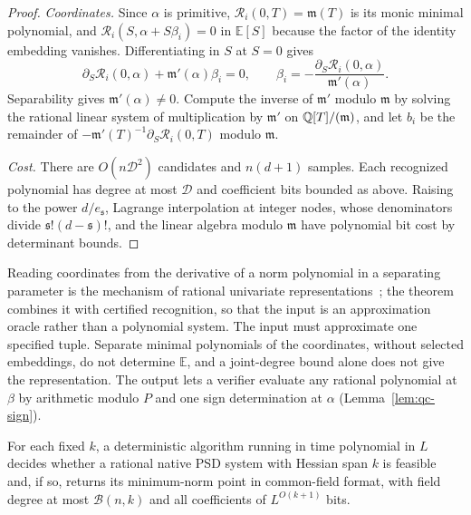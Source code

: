 \begin{proof}
\emph{Coordinates.} Since $\alpha$ is primitive,
$\mathcal R_i(0,T)=\mathfrak m(T)$ is its monic minimal polynomial, and $\mathcal R_i(S,\alpha+S\beta_i)=0$ in
$\mathbb E[S]$ because the factor of the identity embedding vanishes.
Differentiating in $S$ at $S=0$ gives
\[
\partial_S\mathcal R_i(0,\alpha)+\mathfrak m'(\alpha)\beta_i=0,\qquad
\beta_i=-\frac{\partial_S\mathcal R_i(0,\alpha)}{\mathfrak m'(\alpha)} .
\]
Separability gives $\mathfrak m'(\alpha)\ne0$. Compute the inverse of
$\mathfrak m'$ modulo $\mathfrak m$ by solving the rational linear system of multiplication by $\mathfrak m'$ on
$\mathbb Q[T]/(\mathfrak m)$, and let $b_i$ be the remainder of
$-\mathfrak m'(T)^{-1}\partial_S\mathcal R_i(0,T)$ modulo $\mathfrak m$.

\emph{Cost.} There are $O(n\mathcal D^2)$ candidates and $n(d+1)$ samples.
Each recognized polynomial has degree at most $\mathcal D$ and coefficient
bits bounded as above. Raising to the power $d/e_{\mathfrak s}$, Lagrange
interpolation at integer nodes, whose denominators divide $\mathfrak
s!(d-\mathfrak s)!$, and the linear algebra modulo $\mathfrak m$ have polynomial bit
cost by determinant bounds.
\end{proof}

Reading coordinates from the derivative of a norm polynomial in a separating
parameter is the mechanism of rational univariate
representations~\cite{Rouillier1999}; the theorem combines it with certified
recognition, so that the input is an approximation oracle rather than a
polynomial system. The input must approximate one specified tuple. Separate minimal polynomials
of the coordinates, without selected embeddings, do not determine
$\mathbb E$, and a joint-degree bound alone does not give the representation.
The output lets a verifier evaluate any rational polynomial at $\beta$ by
arithmetic modulo $P$ and one sign determination at $\alpha$
(Lemma~\ref{lem:qc-sign}).

\begin{corollary}
\label{cor:qc-feasible-point}
For each fixed $k$, a deterministic algorithm running in time polynomial in
$L$ decides whether a rational native PSD system with Hessian span $k$ is
feasible and, if so, returns its minimum-norm point in common-field format,
with field degree at most $\mathcal B(n,k)$ and all coefficients of
$L^{O(k+1)}$ bits.
\end{corollary}

